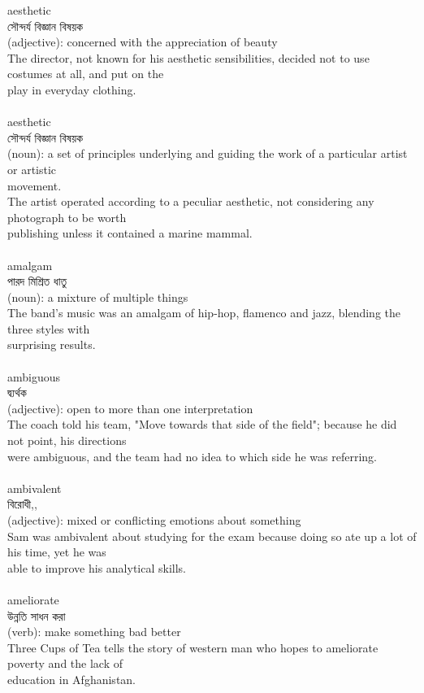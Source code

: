 \documentclass{article}
\begin{document}
{aesthetic}\\
{সৌন্দর্য বিজ্ঞান বিষয়ক}\\
{(adjective): concerned with the appreciation of beauty\\The director, not known for his aesthetic sensibilities, decided not to use costumes at all, and put on the\\play in everyday clothing.\\}\\
{aesthetic}\\
{সৌন্দর্য বিজ্ঞান বিষয়ক}\\
{(noun): a set of principles underlying and guiding the work of a particular artist or artistic\\movement.\\The artist operated according to a peculiar aesthetic, not considering any photograph to be worth\\publishing unless it contained a marine mammal.\\}\\
{amalgam}\\
{পারদ মিশ্রিত ধাতু}\\
{(noun): a mixture of multiple things\\The band's music was an amalgam of hip-hop, flamenco and jazz, blending the three styles with\\surprising results.\\}\\
{ambiguous}\\
{দ্ব্যর্থক}\\
{(adjective): open to more than one interpretation\\The coach told his team, "Move towards that side of the field"; because he did not point, his directions\\were ambiguous, and the team had no idea to which side he was referring.\\}\\
{ambivalent}\\
{বিরোধী,,}\\
{(adjective): mixed or conflicting emotions about something\\Sam was ambivalent about studying for the exam because doing so ate up a lot of his time, yet he was\\able to improve his analytical skills.\\}\\
{ameliorate}\\
{উন্নতি সাধন করা}\\
{(verb): make something bad better\\Three Cups of Tea tells the story of western man who hopes to ameliorate poverty and the lack of\\education in Afghanistan.\\}\\
\end{document}
